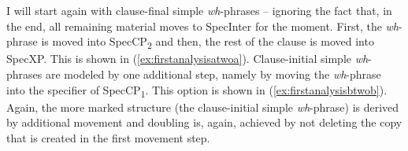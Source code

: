 \vspace{-0.3cm}


\noindent I will start again with clause-final simple \textit{wh}-phrases -- ignoring the fact that, in the end, all remaining material moves to SpecInter for the moment. First, the \textit{wh}-phrase is moved into SpecCP\textsubscript{2} and then, the rest of the clause is moved into SpecXP. This is shown in (\ref{ex:firstanalysisatwoa}). Clause-initial simple \textit{wh}-phrases are modeled by one additional step, namely by moving the \textit{wh}-phrase into the specifier of SpecCP\textsubscript{1}. This option is shown in (\ref{ex:firstanalysisbtwob}). Again, the more marked structure (the clause-initial simple \textit{wh}-phrase) is derived by additional movement and doubling is, again, achieved by not deleting the copy that is created in the first movement step.

\vspace{-0.5cm}


